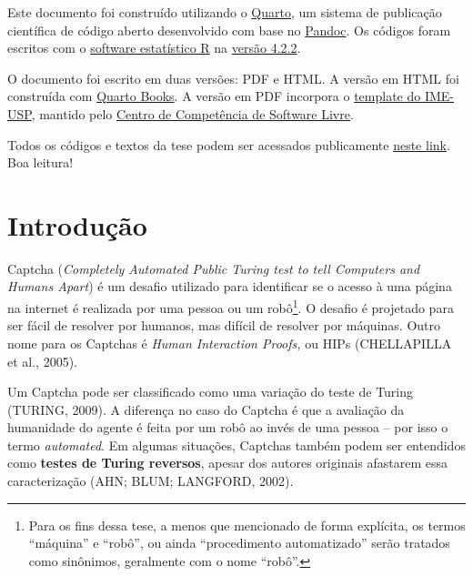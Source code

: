 \documentclass[12pt,twoside,brazilian]{book}
\begin{document}

Este documento foi construído utilizando o
\href{https://quarto.org/}{Quarto}, um sistema de publicação científica
de código aberto desenvolvido com base no
\href{https://pandoc.org/}{Pandoc}. Os códigos foram escritos com o
\href{https://cran.r-project.org/}{software estatístico R} na
\href{https://cran.r-project.org/bin/windows/base/}{versão 4.2.2}.

O documento foi escrito em duas versões: PDF e HTML. A versão em HTML
foi construída com \href{https://quarto.org/docs/books/}{Quarto Books}.
A versão em PDF incorpora o
\href{https://gitlab.com/ccsl-usp/modelo-latex}{template do IME-USP},
mantido pelo \href{https://ccsl.ime.usp.br/}{Centro de Competência de
Software Livre}.

Todos os códigos e textos da tese podem ser acessados publicamente
\href{https://github.com/jtrecenti/doutorado}{neste link}. Boa leitura!


\hypertarget{sec-introducao}{%
\chapter{Introdução}\label{sec-introducao}}


Captcha (\emph{Completely Automated Public Turing test to tell Computers
and Humans Apart}) é um desafio utilizado para identificar se o acesso à
uma página na internet é realizada por uma pessoa ou um robô\footnote{Para
  os fins dessa tese, a menos que mencionado de forma explícita, os
  termos ``máquina'' e ``robô'', ou ainda ``procedimento automatizado''
  serão tratados como sinônimos, geralmente com o nome ``robô''.}. O
desafio é projetado para ser fácil de resolver por humanos, mas difícil
de resolver por máquinas. Outro nome para os Captchas é \emph{Human
Interaction Proofs,} ou HIPs (CHELLAPILLA et al., 2005).

Um Captcha pode ser classificado como uma variação do teste de Turing
(TURING, 2009). A diferença no caso do Captcha é que a avaliação da
humanidade do agente é feita por um robô ao invés de uma pessoa -- por
isso o termo \emph{automated}. Em algumas situações, Captchas também
podem ser entendidos como \textbf{testes de Turing reversos}, apesar dos
autores originais afastarem essa caracterização (AHN; BLUM; LANGFORD,
2002).
\end{document}
